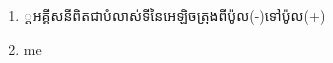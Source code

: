 \documentclass{article}
\author{james1}
\date{\today}
\begin{document}
\begin{enumerate}
\item {}្តអគ្គីសនីពិតជាបំលាស់ទីនៃអេឡិចត្រុងពីប៉ូល(-)ទៅប៉ូល(+)
\item me
\end{enumerate}
\end{document}
